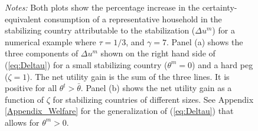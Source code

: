 \begin{figure}[!ht]
\begin{minipage}{\linewidth}
\begin{centering}
\end{centering}
\bigskip

\small \textit{Notes:} Both plots show the percentage increase in the
certainty-equivalent consumption of a representative household in the
stabilizing country attributable to the stabilization ($\Delta u^m $)
for a numerical example where \(\tau=1/3\), and \(\gamma=7\). Panel
(a) shows the three components of $\Delta u^m $ shown on the right
hand side of (\ref{eq:Deltau}) for a small stabilizing country
($\theta^m=0$) and a hard peg (\(\zeta=1\)). The net utility gain is
the sum of the three lines. It is positive for all
\(\theta^t>\bar{\theta}\). Panel (b) shows the net utility gain as a
function of \(\zeta\) for stabilizing countries of different sizes.
See Appendix \ref{Appendix_Welfare} for the generalization of
(\ref{eq:Deltau}) that allows for $\theta^m>0$. \end{minipage}
\end{figure}

\clearpage


